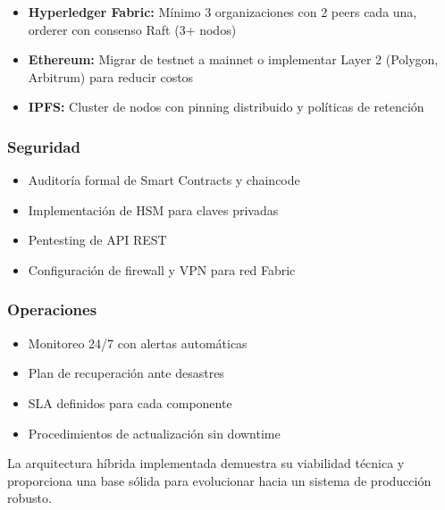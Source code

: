 \begin{itemize}
    \item \textbf{Hyperledger Fabric:} Mínimo 3 organizaciones con 2 peers cada una, orderer con consenso Raft (3+ nodos)
    \item \textbf{Ethereum:} Migrar de testnet a mainnet o implementar Layer 2 (Polygon, Arbitrum) para reducir costos
    \item \textbf{IPFS:} Cluster de nodos con pinning distribuido y políticas de retención
\end{itemize}

\subsubsection{Seguridad}

\begin{itemize}
    \item Auditoría formal de Smart Contracts y chaincode
    \item Implementación de HSM para claves privadas
    \item Pentesting de API REST
    \item Configuración de firewall y VPN para red Fabric
\end{itemize}

\subsubsection{Operaciones}

\begin{itemize}
    \item Monitoreo 24/7 con alertas automáticas
    \item Plan de recuperación ante desastres
    \item SLA definidos para cada componente
    \item Procedimientos de actualización sin downtime
\end{itemize}

La arquitectura híbrida implementada demuestra su viabilidad técnica y proporciona una base sólida para evolucionar hacia un sistema de producción robusto.
